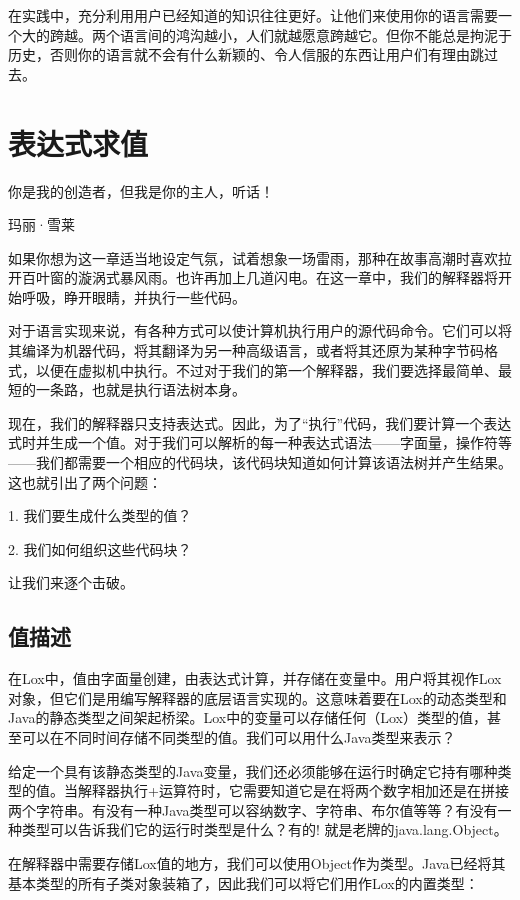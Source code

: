 \documentclass[cn,11pt,chinese]{elegantbook}
\begin{document}
在实践中，充分利用用户已经知道的知识往往更好。让他们来使用你的语言需要一个大的跨越。两个语言间的鸿沟越小，人们就越愿意跨越它。但你不能总是拘泥于历史，否则你的语言就不会有什么新颖的、令人信服的东西让用户们有理由跳过去。

\chapter{表达式求值}

\epigraph{你是我的创造者，但我是你的主人，听话！}{玛丽·雪莱}

如果你想为这一章适当地设定气氛，试着想象一场雷雨，那种在故事高潮时喜欢拉开百叶窗的漩涡式暴风雨。也许再加上几道闪电。在这一章中，我们的解释器将开始呼吸，睁开眼睛，并执行一些代码。

对于语言实现来说，有各种方式可以使计算机执行用户的源代码命令。它们可以将其编译为机器代码，将其翻译为另一种高级语言，或者将其还原为某种字节码格式，以便在虚拟机中执行。不过对于我们的第一个解释器，我们要选择最简单、最短的一条路，也就是执行语法树本身。

现在，我们的解释器只支持表达式。因此，为了“执行”代码，我们要计算一个表达式时并生成一个值。对于我们可以解析的每一种表达式语法——字面量，操作符等——我们都需要一个相应的代码块，该代码块知道如何计算该语法树并产生结果。这也就引出了两个问题：

1. 我们要生成什么类型的值？

2. 我们如何组织这些代码块？

让我们来逐个击破。

\section{值描述}

在Lox中，值由字面量创建，由表达式计算，并存储在变量中。用户将其视作Lox对象，但它们是用编写解释器的底层语言实现的。这意味着要在Lox的动态类型和Java的静态类型之间架起桥梁。Lox中的变量可以存储任何（Lox）类型的值，甚至可以在不同时间存储不同类型的值。我们可以用什么Java类型来表示？

给定一个具有该静态类型的Java变量，我们还必须能够在运行时确定它持有哪种类型的值。当解释器执行+运算符时，它需要知道它是在将两个数字相加还是在拼接两个字符串。有没有一种Java类型可以容纳数字、字符串、布尔值等等？有没有一种类型可以告诉我们它的运行时类型是什么？有的! 就是老牌的java.lang.Object。

在解释器中需要存储Lox值的地方，我们可以使用Object作为类型。Java已经将其基本类型的所有子类对象装箱了，因此我们可以将它们用作Lox的内置类型：
\end{document}
